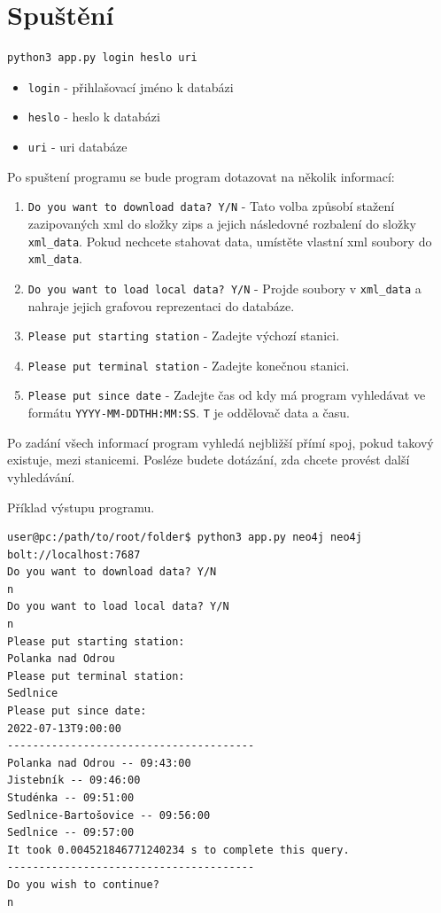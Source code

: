 \documentclass[10pt,xcolor=pdflatex,dvipsnames,table,oneside]{book}
\begin{document}
\section{Spuštění}
\begin{verbatim}
python3 app.py login heslo uri
\end{verbatim}
\begin{itemize}
    \item \verb|login| - přihlašovací jméno k databázi
    \item \verb|heslo| - heslo k databázi
    \item \verb|uri| - uri databáze
\end{itemize}
Po spuštení programu se bude program dotazovat na několik informací:
\begin{enumerate}
    \item \verb|Do you want to download data? Y/N| - Tato volba způsobí stažení zazipovaných xml do
    složky zips a jejich následovné rozbalení do složky \verb|xml_data|. Pokud nechcete stahovat data,
    umístěte vlastní xml soubory do \verb|xml_data|.
    \item \verb|Do you want to load local data? Y/N| - Projde soubory v \verb|xml_data| a nahraje jejich grafovou
    reprezentaci do databáze.
    \item \verb|Please put starting station| - Zadejte výchozí stanici.
    \item \verb|Please put terminal station| - Zadejte konečnou stanici.
    \item \verb|Please put since date| - Zadejte čas od kdy má program vyhledávat ve formátu \verb|YYYY-MM-DDTHH:MM:SS|. \verb|T| je oddělovač data a času.
\end{enumerate}
Po zadání všech informací program vyhledá nejbližší přímí spoj, pokud takový existuje, mezi stanicemi.
Posléze budete dotázání, zda chcete provést další vyhledávání.

\vspace{1em}
Příklad výstupu programu.
\begin{verbatim}
user@pc:/path/to/root/folder$ python3 app.py neo4j neo4j bolt://localhost:7687
Do you want to download data? Y/N
n
Do you want to load local data? Y/N
n
Please put starting station:
Polanka nad Odrou
Please put terminal station:
Sedlnice
Please put since date:
2022-07-13T9:00:00   
---------------------------------------
Polanka nad Odrou -- 09:43:00
Jistebník -- 09:46:00
Studénka -- 09:51:00
Sedlnice-Bartošovice -- 09:56:00
Sedlnice -- 09:57:00
It took 0.004521846771240234 s to complete this query.
---------------------------------------
Do you wish to continue?
n    
\end{verbatim}
\end{document}

